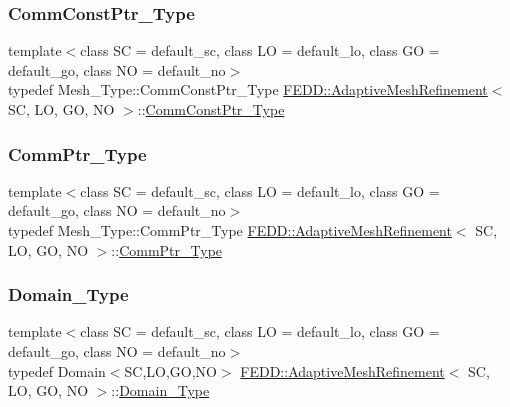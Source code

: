 \subsubsection{\texorpdfstring{Comm\+Const\+Ptr\+\_\+\+Type}{CommConstPtr\_Type}}
{\footnotesize\ttfamily template$<$class SC = default\+\_\+sc, class LO = default\+\_\+lo, class GO = default\+\_\+go, class NO = default\+\_\+no$>$ \\
typedef Mesh\+\_\+\+Type\+::\+Comm\+Const\+Ptr\+\_\+\+Type \hyperlink{classFEDD_1_1AdaptiveMeshRefinement}{F\+E\+D\+D\+::\+Adaptive\+Mesh\+Refinement}$<$ SC, LO, GO, NO $>$\+::\hyperlink{classFEDD_1_1AdaptiveMeshRefinement_a6bd5089532bd8dac39bebc4a92e33c40}{Comm\+Const\+Ptr\+\_\+\+Type}}

\mbox{\label{classFEDD_1_1AdaptiveMeshRefinement_a28759ffaba5c0900ad9ad3b7b185d504}} 
\subsubsection{\texorpdfstring{Comm\+Ptr\+\_\+\+Type}{CommPtr\_Type}}
{\footnotesize\ttfamily template$<$class SC = default\+\_\+sc, class LO = default\+\_\+lo, class GO = default\+\_\+go, class NO = default\+\_\+no$>$ \\
typedef Mesh\+\_\+\+Type\+::\+Comm\+Ptr\+\_\+\+Type \hyperlink{classFEDD_1_1AdaptiveMeshRefinement}{F\+E\+D\+D\+::\+Adaptive\+Mesh\+Refinement}$<$ SC, LO, GO, NO $>$\+::\hyperlink{classFEDD_1_1AdaptiveMeshRefinement_a28759ffaba5c0900ad9ad3b7b185d504}{Comm\+Ptr\+\_\+\+Type}}

\mbox{\label{classFEDD_1_1AdaptiveMeshRefinement_a894158e6863753ca565eabb915e25d9a}} 
\subsubsection{\texorpdfstring{Domain\+\_\+\+Type}{Domain\_Type}}
{\footnotesize\ttfamily template$<$class SC = default\+\_\+sc, class LO = default\+\_\+lo, class GO = default\+\_\+go, class NO = default\+\_\+no$>$ \\
typedef Domain$<$SC,LO,GO,NO$>$ \hyperlink{classFEDD_1_1AdaptiveMeshRefinement}{F\+E\+D\+D\+::\+Adaptive\+Mesh\+Refinement}$<$ SC, LO, GO, NO $>$\+::\hyperlink{classFEDD_1_1AdaptiveMeshRefinement_a894158e6863753ca565eabb915e25d9a}{Domain\+\_\+\+Type}}

